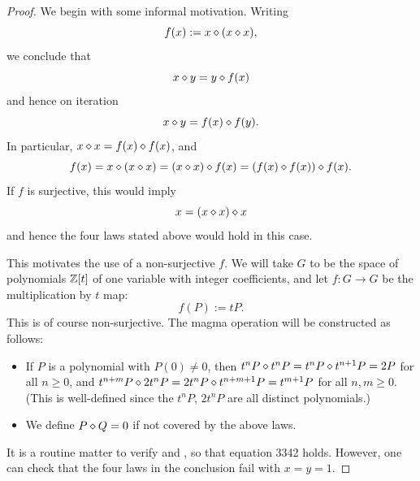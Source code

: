 \begin{proof}
We begin with some informal motivation. Writing
\begin{equation}\label{fdef}
  f(x) := x \diamond (x \diamond x),
\end{equation}
we conclude that
\begin{equation}\label{xop}
   x \diamond y = y \diamond f(x)
\end{equation}
and hence on iteration
$$ x \diamond y = f(x) \diamond f(y).$$
In particular, $x \diamond x = f(x) \diamond f(x)$, and
$$ f(x) = x \diamond (x \diamond x) = (x \diamond x) \diamond f(x) = (f(x) \diamond f(x)) \diamond f(x).$$
If $f$ is surjective, this would imply
$$ x = (x \diamond x) \diamond x$$
and hence the four laws stated above would hold in this case.

This motivates the use of a non-surjective $f$.  We will take $G$ to be the space of polynomials $\mathbb{Z}[t]$ of one variable with integer coefficients, and let $f: G \to G$ be the multiplication by $t$ map:
$$ f(P) := tP.$$
This is of course non-surjective. The magma operation will be constructed as follows:
\begin{itemize}
  \item If $P$ is a polynomial with $P(0) \neq 0$, then $t^n P \diamond t^n P = t^n P \diamond t^{n+1} P = 2P$ for all $n \geq 0$, and $t^{n+m} P \diamond 2t^n P = 2t^n P \diamond t^{n+m+1} P = t^{m+1} P$ for all $n, m \geq 0$.  (This is well-defined since the $t^n P$, $2t^n P$ are all distinct polynomials.)
  \item We define $P \diamond Q = 0$ if not covered by the above laws.
\end{itemize}

It is a routine matter to verify  and , so that equation 3342 holds.  However, one can check that the four laws in the conclusion fail with $x=y=1$.
\end{proof}


